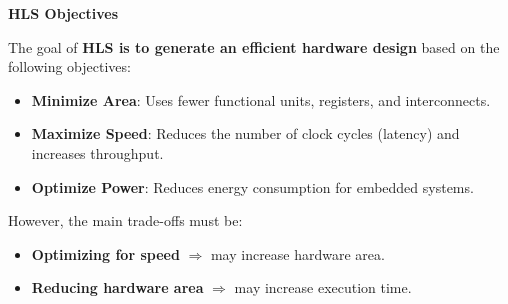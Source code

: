 \highspace
\begin{flushleft}
    \textcolor{Green3}{ \textbf{HLS Objectives}}
\end{flushleft}
The goal of \textbf{HLS is to generate an efficient hardware design} based on the following objectives:
\begin{itemize}[label=\textcolor{Green3}{}]
    \item \textcolor{Green3}{\textbf{Minimize Area}}: Uses fewer functional units, registers, and interconnects.
    \item \textcolor{Green3}{\textbf{Maximize Speed}}: Reduces the number of clock cycles (latency) and increases throughput.
    \item \textcolor{Green3}{\textbf{Optimize Power}}: Reduces energy consumption for embedded systems.
\end{itemize}
However, the main trade-offs must be:
\begin{itemize}
    \item \textbf{Optimizing for speed} $\Rightarrow$ may increase hardware area.
    \item \textbf{Reducing hardware area} $\Rightarrow$ may increase execution time.
\end{itemize}

\newpage

